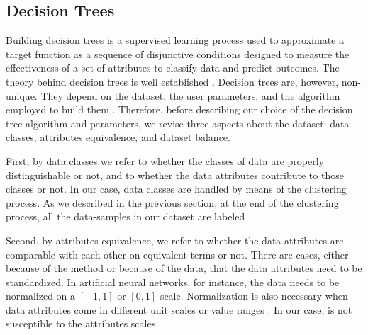 
\subsection{Decision Trees}
\label{sec:decision-tree}

Building decision trees is a supervised learning process used to approximate a target function as a sequence of disjunctive conditions designed to measure the effectiveness of a set of attributes to classify data and predict outcomes. The theory behind decision trees is well established \citep[e.g.,][]{Quinlan_1986_ML, Quinlan_1993_Book, Mitchell_1997_Book}.
Decision trees are, however, non-unique. They depend on the dataset, the user parameters, and the algorithm employed to build them \citep{Murthy_1998_DMKD}. Therefore, before describing our choice of the decision tree algorithm and parameters, we revise three aspects about the dataset: data classes, attributes equivalence, and dataset balance.

First, by data classes we refer to whether the classes of data are properly distinguishable or not, and to whether the data attributes contribute to those classes or not. In our case, data classes are handled by means of the clustering process. As we described in the previous section, at the end of the clustering process, all the data-samples in our dataset are labeled 


Second, by attributes equivalence, we refer to whether the data attributes are comparable with each other on equivalent terms or not. There are cases, either because of the method or because of the data, that the data attributes need to be standardized. In artificial neural networks, for instance, the data needs to be normalized on a $[-1,1]$ or $[0,1]$ scale. Normalization is also necessary when data attributes come in different unit scales or value ranges \citep[e.g.,][]{Wu_2010_JH}. In our case,  is not susceptible to the attributes scales.

